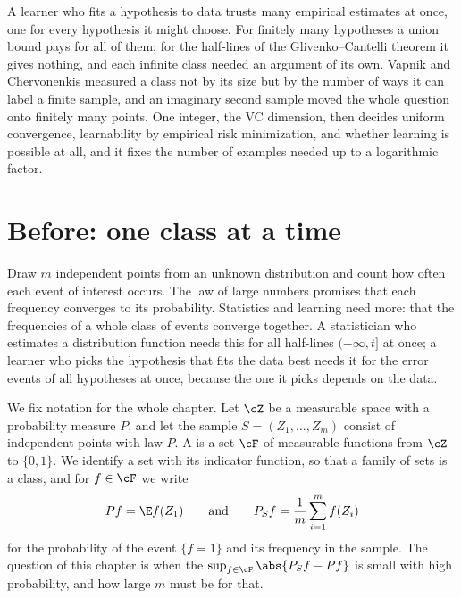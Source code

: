 \begin{refsection}[chapters/11-vc.bib]
\newcommand{\vcdim}{\operatorname{VCdim}}
\newcommand{\vcGrowth}{\Pi}
\newcommand{\vcfat}{\operatorname{fat}}
\newcommand{\vcRad}{\operatorname{Rad}}

\begin{chaptersummary}
A learner who fits a hypothesis to data trusts many empirical estimates at once, one for every hypothesis it might choose. For finitely many hypotheses a union bound pays for all of them; for the half-lines of the Glivenko--Cantelli theorem it gives nothing, and each infinite class needed an argument of its own. Vapnik and Chervonenkis measured a class not by its size but by the number of ways it can label a finite sample, and an imaginary second sample moved the whole question onto finitely many points. One integer, the VC dimension, then decides uniform convergence, learnability by empirical risk minimization, and whether learning is possible at all, and it fixes the number of examples needed up to a logarithmic factor.
\end{chaptersummary}

\section{Before: one class at a time}\label{sec:vc:before}

Draw $m$ independent points from an unknown distribution and count how often each event of interest occurs. The law of large numbers promises that each frequency converges to its probability. Statistics and learning need more: that the frequencies of a whole class of events converge together. A statistician who estimates a distribution function needs this for all half-lines $(-\infty,t]$ at once; a learner who picks the hypothesis that fits the data best needs it for the error events of all hypotheses at once, because the one it picks depends on the data.

We fix notation for the whole chapter. Let $\cZ$ be a measurable space with a probability measure $P$, and let the sample $S = (Z_1,\dots,Z_m)$ consist of independent points with law $P$. A  is a set $\cF$ of measurable functions from $\cZ$ to $\{0,1\}$. We identify a set with its indicator function, so that a family of sets is a class, and for $f\in\cF$ we write
\[
  Pf = \E f(Z_1) \qquad\text{and}\qquad P_Sf = \frac1m\sum_{i=1}^m f(Z_i)
\]
for the probability of the event $\{f=1\}$ and its frequency in the sample. The question of this chapter is when the  $\sup_{f\in\cF}\abs{P_Sf-Pf}$ is small with high probability, and how large $m$ must be for that.


\end{refsection}
